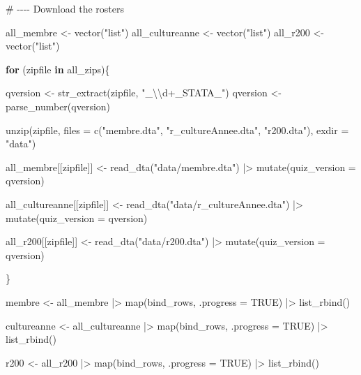 \documentclass[
  letterpaper,
  DIV=11,
  numbers=noendperiod]{scrreprt}
\newenvironment{Shaded}{\begin{snugshade}}{\end{snugshade}}
\newcommand{\AttributeTok}[1]{\textcolor[rgb]{0.40,0.45,0.13}{#1}}
\newcommand{\CommentTok}[1]{\textcolor[rgb]{0.37,0.37,0.37}{#1}}
\newcommand{\ConstantTok}[1]{\textcolor[rgb]{0.56,0.35,0.01}{#1}}
\newcommand{\ControlFlowTok}[1]{\textcolor[rgb]{0.00,0.23,0.31}{\textbf{#1}}}
\newcommand{\FunctionTok}[1]{\textcolor[rgb]{0.28,0.35,0.67}{#1}}
\newcommand{\NormalTok}[1]{\textcolor[rgb]{0.00,0.23,0.31}{#1}}
\newcommand{\OtherTok}[1]{\textcolor[rgb]{0.00,0.23,0.31}{#1}}
\newcommand{\SpecialCharTok}[1]{\textcolor[rgb]{0.37,0.37,0.37}{#1}}
\newcommand{\StringTok}[1]{\textcolor[rgb]{0.13,0.47,0.30}{#1}}
\begin{document}
\begin{Shaded}
\begin{Highlighting}[]
\CommentTok{\# {-}{-}{-}{-} Download the rosters}

\NormalTok{all\_membre }\OtherTok{\textless{}{-}} \FunctionTok{vector}\NormalTok{(}\StringTok{"list"}\NormalTok{)}
\NormalTok{all\_cultureanne }\OtherTok{\textless{}{-}} \FunctionTok{vector}\NormalTok{(}\StringTok{"list"}\NormalTok{)}
\NormalTok{all\_r200 }\OtherTok{\textless{}{-}} \FunctionTok{vector}\NormalTok{(}\StringTok{"list"}\NormalTok{)}


\ControlFlowTok{for}\NormalTok{ (zipfile }\ControlFlowTok{in}\NormalTok{ all\_zips)\{}

\NormalTok{  qversion }\OtherTok{\textless{}{-}} \FunctionTok{str\_extract}\NormalTok{(zipfile, }\StringTok{"\_}\SpecialCharTok{\textbackslash{}\textbackslash{}}\StringTok{d+\_STATA\_"}\NormalTok{)}
\NormalTok{  qversion }\OtherTok{\textless{}{-}} \FunctionTok{parse\_number}\NormalTok{(qversion)}


  \FunctionTok{unzip}\NormalTok{(zipfile, }\AttributeTok{files =} \FunctionTok{c}\NormalTok{(}\StringTok{"membre.dta"}\NormalTok{, }\StringTok{"r\_cultureAnnee.dta"}\NormalTok{, }\StringTok{"r200.dta"}\NormalTok{),}
        \AttributeTok{exdir =} \StringTok{"data"}\NormalTok{)}


\NormalTok{  all\_membre[[zipfile]] }\OtherTok{\textless{}{-}} \FunctionTok{read\_dta}\NormalTok{(}\StringTok{"data/membre.dta"}\NormalTok{) }\SpecialCharTok{|\textgreater{}}
    \FunctionTok{mutate}\NormalTok{(}\AttributeTok{quiz\_version =}\NormalTok{ qversion)}
  
\NormalTok{  all\_cultureanne[[zipfile]] }\OtherTok{\textless{}{-}} \FunctionTok{read\_dta}\NormalTok{(}\StringTok{"data/r\_cultureAnnee.dta"}\NormalTok{) }\SpecialCharTok{|\textgreater{}}
    \FunctionTok{mutate}\NormalTok{(}\AttributeTok{quiz\_version =}\NormalTok{ qversion)}
  
  
\NormalTok{  all\_r200[[zipfile]] }\OtherTok{\textless{}{-}} \FunctionTok{read\_dta}\NormalTok{(}\StringTok{"data/r200.dta"}\NormalTok{) }\SpecialCharTok{|\textgreater{}}
    \FunctionTok{mutate}\NormalTok{(}\AttributeTok{quiz\_version =}\NormalTok{ qversion)}
  
\NormalTok{\}}


\NormalTok{membre }\OtherTok{\textless{}{-}}\NormalTok{ all\_membre }\SpecialCharTok{|\textgreater{}} 
  \FunctionTok{map}\NormalTok{(bind\_rows, }\AttributeTok{.progress =} \ConstantTok{TRUE}\NormalTok{) }\SpecialCharTok{|\textgreater{}}  
  \FunctionTok{list\_rbind}\NormalTok{() }


\NormalTok{cultureanne }\OtherTok{\textless{}{-}}\NormalTok{ all\_cultureanne }\SpecialCharTok{|\textgreater{}} 
  \FunctionTok{map}\NormalTok{(bind\_rows, }\AttributeTok{.progress =} \ConstantTok{TRUE}\NormalTok{) }\SpecialCharTok{|\textgreater{}}  
  \FunctionTok{list\_rbind}\NormalTok{() }

\NormalTok{r200 }\OtherTok{\textless{}{-}}\NormalTok{ all\_r200 }\SpecialCharTok{|\textgreater{}} 
  \FunctionTok{map}\NormalTok{(bind\_rows, }\AttributeTok{.progress =} \ConstantTok{TRUE}\NormalTok{) }\SpecialCharTok{|\textgreater{}}  
  \FunctionTok{list\_rbind}\NormalTok{() }
\end{Highlighting}
\end{Shaded}
\end{document}
